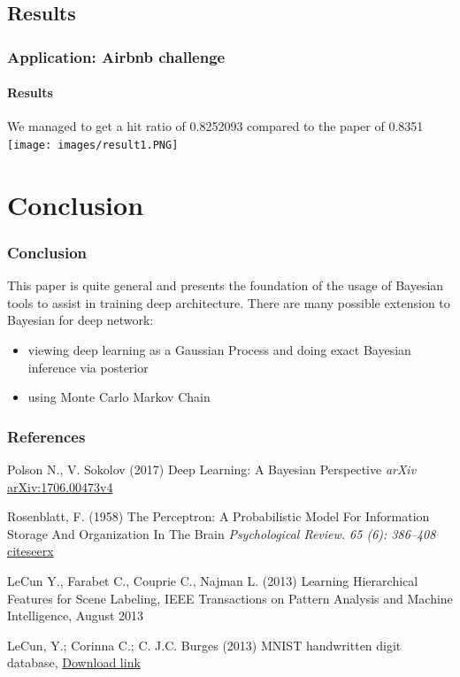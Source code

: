 \documentclass{beamer}
\begin{document}
\subsection{Results}
\begin{frame}
\frametitle{Application: Airbnb challenge}
\framesubtitle{Results}
We managed to get a hit ratio of 0.8252093 compared to the paper of 0.8351
\texttt{[image: images/result1.PNG]} 
\end{frame}



\section{Conclusion}
\begin{frame}
\frametitle{Conclusion}
This paper is quite general and presents the foundation of the usage of Bayesian tools to assist in training deep architecture.
There are many possible extension to Bayesian for deep network:
\begin{itemize}
\item viewing deep learning as a Gaussian Process and doing exact Bayesian inference via posterior
\item using Monte Carlo Markov Chain
\end{itemize}
\end{frame}



\begin{frame}
\frametitle{References}
\footnotesize{
\begin{thebibliography}{99} 
 Polson N., V. Sokolov (2017)
\newblock Deep Learning: A Bayesian Perspective
\newblock \emph{arXiv} \href{https://arxiv.org/pdf/1706.00473}{arXiv:1706.00473v4}

 Rosenblatt, F. (1958)
\newblock The Perceptron: A Probabilistic Model For Information Storage And Organization In The Brain
\newblock \emph{Psychological Review. 65 (6): 386–408} \href{http://citeseerx.ist.psu.edu/viewdoc/download?doi=10.1.1.335.3398&rep=rep1&type=pdf}{citeseerx}

 LeCun Y., Farabet C., Couprie C., Najman L. (2013)
\newblock Learning Hierarchical Features for Scene Labeling, 
\newblock IEEE Transactions on Pattern Analysis and Machine Intelligence, August 2013

 LeCun, Y.; Corinna C.; C. J.C. Burges (2013)
\newblock MNIST handwritten digit database, 
\newblock \href{http://yann.lecun.com/exdb/mnist}{Download link}

\end{thebibliography}
}
\end{frame}
\end{document}
